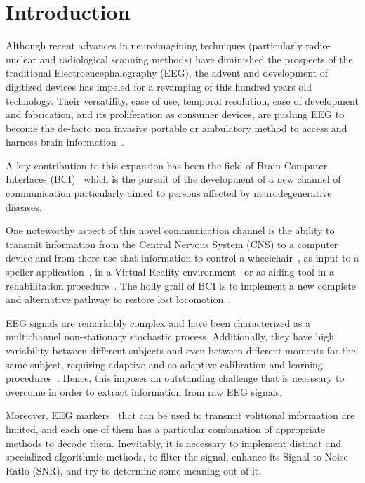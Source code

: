 \documentclass[utf8]{frontiersSCNS} %
\begin{document}
\section{Introduction}

Although recent advances in neuroimagining techniques (particularly radio-nuclear and radiological scanning methods) \citep{Schomer2010} have diminished the prospects of the traditional Electroencephalography (EEG), the advent and development of digitized devices has impeled for a revamping of this hundred years old technology.  Their versatility, ease of use, temporal resolution, ease of development and fabrication, and its proliferation as consumer devices, are pushing EEG to become the de-facto non invasive portable or ambulatory method to access and harness brain information~\citep{DeVos2014}.

A key contribution to this expansion has been the field of Brain Computer Interfaces (BCI)~\citep{WolpawJonathanR2012} which is the pursuit of the development of a new channel of communication particularly aimed to persons affected by neurodegenerative diseases.

One noteworthy aspect of this novel communication channel is the ability to transmit information from the Central Nervous System (CNS) to a computer device and from there use that information to control a wheelchair~\citep{Carlson2013}, as input to a speller application~\citep{Guger2009a}, in a Virtual Reality environment~\citep{Lotte2013} or as aiding tool in a rehabilitation procedure~\citep{Jure2016}.  The holly grail of BCI is to implement a new complete and alternative pathway to restore lost locomotion~\citep{WolpawJonathanR2012}.

EEG signals are remarkably complex and have been characterized as a multichannel non-stationary stochastic process.  Additionally, they have high variability between different subjects and even between different moments for the same subject, requiring adaptive and co-adaptive calibration and learning procedures~\citep{Clerc}.  Hence, this imposes an outstanding challenge that is necessary to overcome in order to extract information from raw EEG signals.

Moreover, EEG markers~\citep{Clerc} that can be used to  transmit volitional information are limited, and each one of them has a particular combination of appropriate methods to decode them. Inevitably, it is necessary to implement  distinct and specialized algorithmic methods, to filter the signal, enhance its Signal to Noise Ratio (SNR), and try to determine some meaning out of it.  
\end{document}
